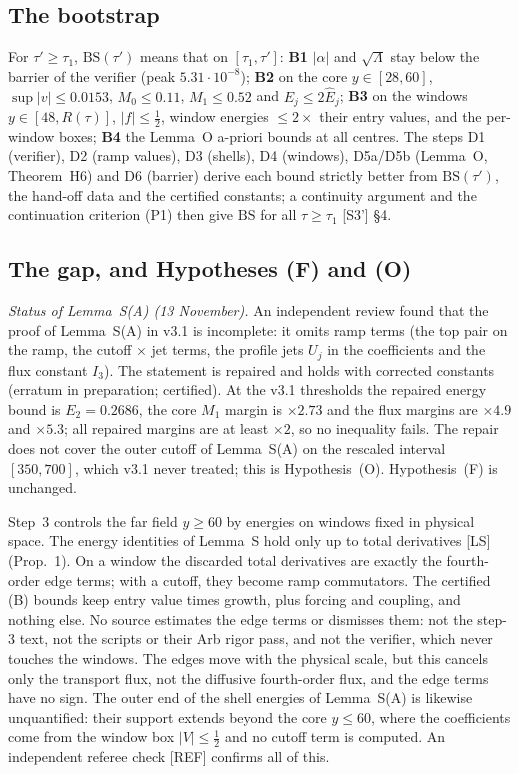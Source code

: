 \documentclass[11pt]{amsart}
\theoremstyle{definition}
\theoremstyle{remark}
\newcommand{\Lam}{\Lambda}
\newcommand{\dref}[1]{[\textsf{#1}]}
\begin{document}
\subsection{The bootstrap}\label{ss:boot}
For $\tau'\ge\tau_1$, $\mathrm{BS}(\tau')$ means that on $[\tau_1,\tau']$: \textbf{B1} $|\alpha|$ and $\sqrt\Lam$ stay below the barrier of the verifier (peak $5.31\cdot10^{-8}$); \textbf{B2} on the core $y\in[28,60]$, $\sup|v|\le0.0153$, $M_0\le0.11$, $M_1\le0.52$ and $E_j\le2\hat E_j$; \textbf{B3} on the windows $y\in[48,R(\tau)]$, $|f|\le\frac12$, window energies $\le2\times$ their entry values, and the per-window boxes; \textbf{B4} the Lemma~O a-priori bounds at all centres. The steps D1 (verifier), D2 (ramp values), D3 (shells), D4 (windows), D5a/D5b (Lemma~O, Theorem~H6) and D6 (barrier) derive each bound strictly better from $\mathrm{BS}(\tau')$, the hand-off data and the certified constants; a continuity argument and the continuation criterion (P1) then give $\mathrm{BS}$ for all $\tau\ge\tau_1$ \dref{S3'} \S4.

\subsection{The gap, and Hypotheses (F) and (O)}\label{ss:gap}
\emph{Status of Lemma~S(A) (13 November).} An independent review found that the proof of Lemma~S(A) in v3.1 is incomplete: it omits ramp terms (the top pair on the ramp, the cutoff $\times$ jet terms, the profile jets $U_j$ in the coefficients and the flux constant $I_3$). The statement is repaired and holds with corrected constants (erratum in preparation; certified). At the v3.1 thresholds the repaired energy bound is $E_2=0.2686$, the core $M_1$ margin is $\times2.73$ and the flux margins are $\times4.9$ and $\times5.3$; all repaired margins are at least $\times2$, so no inequality fails. The repair does not cover the outer cutoff of Lemma~S(A) on the rescaled interval $[350,700]$, which v3.1 never treated; this is Hypothesis~(O). Hypothesis~(F) is unchanged.


Step~3 controls the far field $y\ge60$ by energies on windows fixed in physical space. The energy identities of Lemma~S hold only up to total derivatives \dref{LS} (Prop.~1). On a window the discarded total derivatives are exactly the fourth-order edge terms; with a cutoff, they become ramp commutators. The certified (B) bounds keep entry value times growth, plus forcing and coupling, and nothing else. No source estimates the edge terms or dismisses them: not the step-3 text, not the scripts or their Arb rigor pass, and not the verifier, which never touches the windows. The edges move with the physical scale, but this cancels only the transport flux, not the diffusive fourth-order flux, and the edge terms have no sign. The outer end of the shell energies of Lemma~S(A) is likewise unquantified: their support extends beyond the core $y\le60$, where the coefficients come from the window box $|V|\le\frac12$ and no cutoff term is computed. An independent referee check \dref{REF} confirms all of this.
\end{document}

